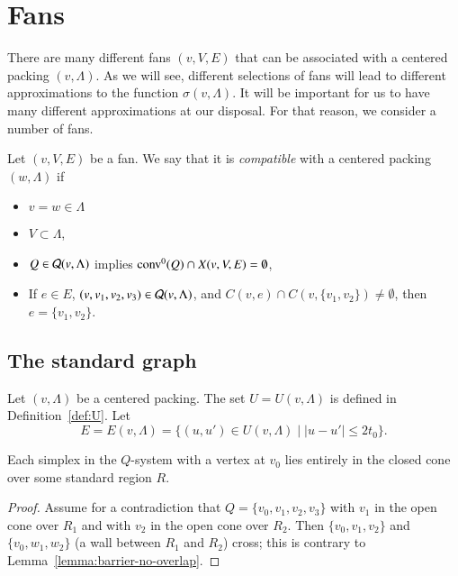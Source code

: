 \section{Fans}

There are many different fans $(v,V,E)$ that
can be associated with a centered packing $(v,\Lambda)$.
As we will see, different selections of fans
will lead to different approximations to the function $\sigma(v,\Lambda)$.
It will be important for us to have many different approximations
at our disposal.  For that reason, we consider a number of
fans.

\begin{definition}\label{def:compatible}
Let $(v,V,E)$ be a fan.  We say that it is
{\it compatible} with a centered packing $(w,\Lambda)$ 
if 
\begin{itemize}
\item 
$v=w\in\Lambda$
\item
 $V\subset \Lambda$, 
\item  $Q\in {\mathcal Q}(v,\Lambda)$ implies
${\operatorname{conv}}^0(Q)\cap X(v,V,E)=\emptyset$,
\item  If $e\in E$, $(v,v_1,v_2,v_3)\in {\mathcal Q}(v,\Lambda)$,
and $C(v,e)\cap C(v,\{v_1,v_2\})\ne \emptyset$, then
   $e = \{v_1,v_2\}$.
\end{itemize}
\end{definition}

\subsection{The standard graph}

Let $(v,\Lambda)$ be a centered packing.  The set $U=U(v,\Lambda)$
is defined in Definition~\ref{def:U}.  
Let 
$$E = E(v,\Lambda) = \{(u,u')\in U(v,\Lambda) \mid |u-u'|\le 2t_0\}.
$$

\begin{lemma}
\label{lemma:Q-in-region} Each simplex in the $Q$-system with a
vertex at $v_0$ lies entirely in the closed cone over some
standard region $R$.
\end{lemma}

\begin{proof}  Assume for a contradiction that $Q=\{v_0,v_1,v_2,v_3\}$
with $v_1$ in the open cone over $R_1$ and with $v_2$ in the open
cone over $R_2$.  Then $\{v_0,v_1,v_2\}$ and $\{v_0,w_1,w_2\}$ (a wall
between $R_1$ and $R_2$) cross;  this is contrary to
Lemma~\ref{lemma:barrier-no-overlap}.
\end{proof}

